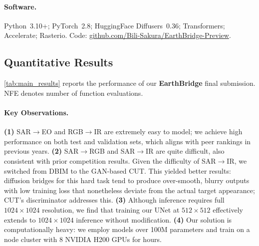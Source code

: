 \paragraph{Software.}
Python~3.10+; PyTorch~2.8; HuggingFace Diffusers~0.36; Transformers; Accelerate; Rasterio. Code: \href{https://github.com/Bili-Sakura/EarthBridge-Preview}{github.com/Bili-Sakura/EarthBridge-Preview}.

\subsection{Quantitative Results}
\label{sec:quantitative}

\cref{tab:main_results} reports the performance of our \textbf{EarthBridge} final submission. NFE denotes number of function evaluations.

\begin{table}[h]
\centering
\caption{Results on the MAVIC-T evaluation set. $\downarrow$ lower is better.}
\label{tab:main_results}
\end{table}

\paragraph{Key Observations.}
\textbf{(1)} SAR$\rightarrow$EO and RGB$\rightarrow$IR are extremely easy to model; we achieve high performance on both test and validation sets, which aligns with peer rankings in previous years. \textbf{(2)} SAR$\rightarrow$RGB and SAR$\rightarrow$IR are quite difficult, also consistent with prior competition results. Given the difficulty of SAR$\rightarrow$IR, we switched from DBIM to the GAN-based CUT. This yielded better results: diffusion bridges for this hard task tend to produce over-smooth, blurry outputs with low training loss that nonetheless deviate from the actual target appearance; CUT's discriminator addresses this. \textbf{(3)} Although inference requires full $1024{\times}1024$ resolution, we find that training our UNet at $512{\times}512$ effectively extends to $1024{\times}1024$ inference without modification. \textbf{(4)} Our solution is computationally heavy: we employ models over 100M parameters and train on a node cluster with 8 NVIDIA H200 GPUs for hours.
